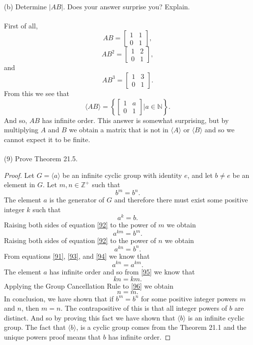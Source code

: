 \documentclass[11pt,a4paper]{article}
\begin{document}
~\\
(b) Determine $|AB|$. Does your answer surprise you? Explain.\\
~\\
First of all,
\[AB = \begin{bmatrix}1&1\\0&1\end{bmatrix}, \]
\[AB^2 = \begin{bmatrix}1&2\\0&1\end{bmatrix},\]
and
\[AB^3 = \begin{bmatrix}1&3\\0&1\end{bmatrix}.\]
From this we see that \[\langle AB \rangle = \left\{ \begin{bmatrix}1&a\\0&1\end{bmatrix} | a \in \mathbb{N}   \right\}.\]
And so, $AB$ has infinite order. This answer is somewhat surprising, but by multiplying $A$ and $B$ we obtain a matrix that is not in $\langle A \rangle$ or $\langle B \rangle$ and so we cannot expect it to be finite.\\
~\\
(9) Prove Theorem 21.5.
\begin{proof}
Let $G = \langle a \rangle$ be an infinite cyclic group with identity $e$, and let $b \neq e$ be an element in $G$. Let $m,n\in \mathbb{Z}^+$ such that 
\begin{equation}\label{91}
b^m = b^n.
\end{equation}
The element $a$ is the generator of $G$ and therefore there must exist some positive integer $k$ such that 
\begin{equation}\label{92}
a^k = b.
\end{equation}
Raising both sides of equation \eqref{92} to the power of $m$ we obtain
\begin{equation}\label{93}
a^{km} = b^m.
\end{equation}
Raising both sides of equation \eqref{92} to the power of $n$ we obtain
\begin{equation}\label{94}
a^{kn} = b^n.
\end{equation}
From equations \eqref{91}, \eqref{93}, and \eqref{94} we know that
\begin{equation}\label{95}
a^{kn} = a^{km}.
\end{equation}
The element $a$ has infinite order and so from \eqref{95} we know that
\begin{equation}\label{96}
kn = km.
\end{equation}
Applying the Group Cancellation Rule to \eqref{96} we obtain
\[n = m.\]
In conclusion, we have shown that if $b^m = b^n$ for some positive integer powers $m$ and $n$, then $m = n$. The contrapositive of this is that all integer powers of $b$ are distinct. And so by proving this fact we have shown that $\langle b \rangle$ is an infinite cyclic group. The fact that $\langle b \rangle$, is a cyclic group comes from the Theorem 21.1 and the unique powers proof means that $b$ has infinite order.
\end{proof}
\end{document}
